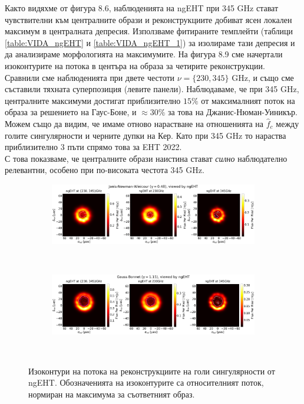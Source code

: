 Както видяхме от фигура 8.6, наблюденията на ngEHT при 345 GHz стават чувствителни към централните образи и реконструкциите добиват ясен локален максимум в централната депресия. Използваме фитираните темплейти (таблици \ref{table:VIDA_ngEHT} и \ref{table:VIDA_ngEHT_1}) за изолираме тази депресия и да анализираме морфологията на максимумите. На фигура 8.9 сме начертали изоконтурите на потока в центъра на образа за четирите реконструкции. Сравнили сме наблюденията при двете честоти $\nu = \{230, 345\}$ GHz, и също сме съставили тяхната суперпозиция (левите панели). Наблюдаваме, че при 345 GHz, централните максимуми достигат приблизително $15\%$ от максималният поток на образа за решението на Гаус-Боне, и $\approx 30\%$ за това на Джанис-Нюман-Уиникър. Можем също да видим, че имаме отново нарастване на отношенията на $\hat{f}_c$ между голите сингулярности и черните дупки на Кер. Като при 345 GHz то нараства приблизително 3 пъти спрямо това за EHT 2022.\\

С това показваме, че централните образи наистина стават \emph{силно} наблюдателно релевантни, особено при по-високата честота 345 GHz. 

\begin{figure}[h!]
	\centering
	\begin{subfigure}{12cm}
		\hspace{-1.5cm}
		\includegraphics[scale = 0.2]{Superpos_Compare_JNW.png}
	\end{subfigure}\\
	\begin{subfigure}{12cm}
		\hspace{-1.5cm}
		\includegraphics[scale = 0.2]{Superpos_Compare_GB.png}
	\end{subfigure}\\
	\label{isoflux_ngEHT}
	\caption[Изоконтури на потока на реконструкциите на голи сингулярности от ngEHT.]{Изоконтури на потока на реконструкциите на голи сингулярности от ngEHT. Обозначенията на изоконтурите са относителният поток, нормиран на максимума за съответният образ.} 
\end{figure}

